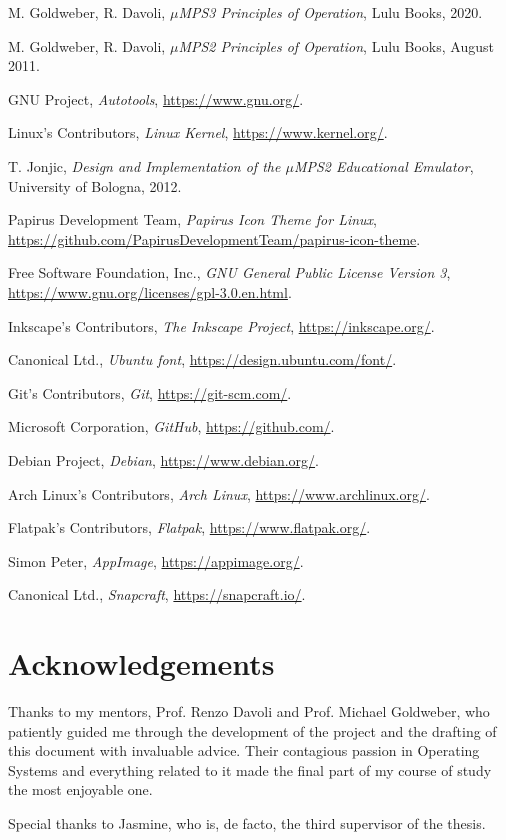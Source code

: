\documentclass[12pt,a4paper,openright,twoside]{report}
\begin{document}
\begin{thebibliography}{99}
	M. Goldweber, R. Davoli,
	\textit{$\mu$MPS3 Principles of Operation},
	Lulu Books, 2020.

	M. Goldweber, R. Davoli,
	\textit{$\mu$MPS2 Principles of Operation},
	Lulu Books, August 2011.

	GNU Project,
	\textit{Autotools},
	\url{https://www.gnu.org/}.

	Linux's Contributors,
	\textit{Linux Kernel},
	\url{https://www.kernel.org/}.

	T. Jonjic,
	\textit{Design and Implementation of the $\mu$MPS2 Educational Emulator},
	University of Bologna, 2012.

	Papirus Development Team,
	\textit{Papirus Icon Theme for Linux},
	\url{https://github.com/PapirusDevelopmentTeam/papirus-icon-theme}.

	Free Software Foundation, Inc.,
	\textit{GNU General Public License Version 3},
	\url{https://www.gnu.org/licenses/gpl-3.0.en.html}.

	Inkscape's Contributors,
	\textit{The Inkscape Project},
	\url{https://inkscape.org/}.

	Canonical Ltd.,
	\textit{Ubuntu font},
	\url{https://design.ubuntu.com/font/}.

	Git's Contributors,
	\textit{Git},
	\url{https://git-scm.com/}.

	Microsoft Corporation,
	\textit{GitHub},
	\url{https://github.com/}.

	Debian Project,
	\textit{Debian},
	\url{https://www.debian.org/}.

	Arch Linux's Contributors,
	\textit{Arch Linux},
	\url{https://www.archlinux.org/}.

	Flatpak's Contributors,
	\textit{Flatpak},
	\url{https://www.flatpak.org/}.

	Simon Peter,
	\textit{AppImage},
	\url{https://appimage.org/}.

	Canonical Ltd.,
	\textit{Snapcraft},
	\url{https://snapcraft.io/}.

\end{thebibliography}

\chapter*{Acknowledgements}
Thanks to my mentors, Prof. Renzo Davoli and Prof. Michael Goldweber, who patiently guided me through the development of the project and the drafting of this document with invaluable advice.
Their contagious passion in Operating Systems and everything related to it made the final part of my course of study the most enjoyable one.

Special thanks to Jasmine, who is, de facto, the third supervisor of the thesis.
\end{document}

